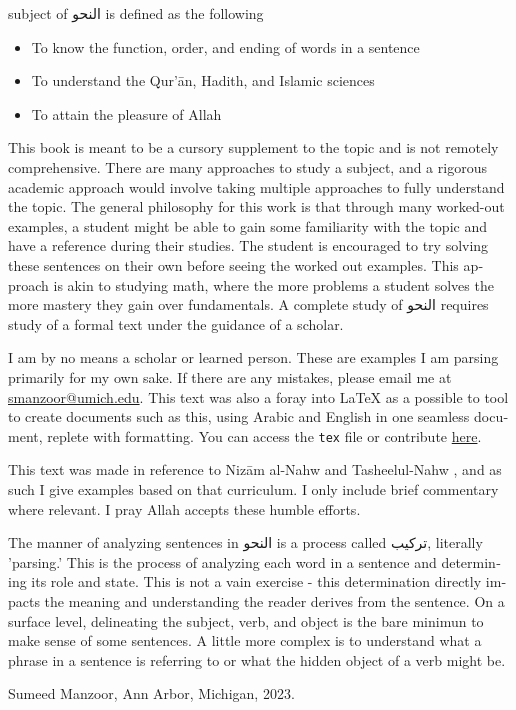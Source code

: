 \documentclass[../main.tex]{subfiles}
\begin{document}
\begin{english}
     subject of \textarabic{النحو} is defined as the following
    \begin{itemize}
        \item To know the function, order, and ending of words in a sentence
        \item To understand the Qur'ān, Hadith, and Islamic sciences
        \item To attain the pleasure of Allah \jalla
    \end{itemize}
    This book is meant to be a cursory supplement to the topic and is not remotely comprehensive. There are many approaches to study a subject, and a rigorous academic approach would involve taking multiple approaches to fully understand the topic. The general philosophy for this work is that through many worked-out examples, a student might be able to gain some familiarity with the topic and have a reference during their studies. The student is encouraged to try solving these sentences on their own before seeing the worked out examples. This approach is akin to studying math, where the more problems a student solves the more mastery they gain over fundamentals. A complete study of \textarabic{النحو} requires study of a formal text under the guidance of a scholar.

    I am by no means a scholar or learned person. These are examples I am parsing primarily for my own sake. If there are any mistakes, please email me at \href{mailto:smanzoor@umich.edu}{smanzoor@umich.edu}. This text was also a foray into LaTeX as a possible to tool to create documents such as this, using Arabic and English in one seamless document, replete with formatting. You can access the \verb|tex| file or contribute \href{https://github.com/Yoyomanzoor/alnahw-bilmiran}{here}.

    This text was made in reference to Nizām al-Nahw \autocite{nizam} and Tasheelul-Nahw \autocite{tasheel}, and as such I give examples based on that curriculum. I only include brief commentary where relevant. I pray Allah accepts these humble efforts.
    
    The manner of analyzing sentences in \textarabic{النحو} is a process called \textarabic{تركيب}, literally 'parsing.' This is the process of analyzing each word in a sentence and determining its role and state. This is not a vain exercise - this determination directly impacts the meaning and understanding the reader derives from the sentence. On a surface level, delineating the subject, verb, and object is the bare minimun to make sense of some sentences. A little more complex is to understand what a phrase in a sentence is referring to or what the hidden object of a verb might be.
    
    Sumeed Manzoor, Ann Arbor, Michigan, 2023.
\end{english}

\pagebreak
\end{document}
